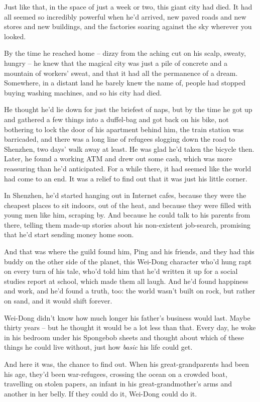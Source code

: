 Just like that, in the space of just a week or two, this giant city
had died. It had all seemed so incredibly powerful when he'd
arrived, new paved roads and new stores and new buildings, and the
factories soaring against the sky wherever you looked.

By the time he reached home -- dizzy from the aching cut on his
scalp, sweaty, hungry -- he knew that the magical city was just a
pile of concrete and a mountain of workers' sweat, and that it had
all the permanence of a dream. Somewhere, in a distant land he
barely knew the name of, people had stopped buying washing
machines, and so his city had died.

He thought he'd lie down for just the briefest of naps, but by the
time he got up and gathered a few things into a duffel-bag and got
back on his bike, not bothering to lock the door of his apartment
behind him, the train station was barricaded, and there was a long
line of refugees slogging down the road to Shenzhen, two days' walk
away at least. He was glad he'd taken the bicycle then. Later, he
found a working ATM and drew out some cash, which was more
reassuring than he'd anticipated. For a while there, it had seemed
like the world had come to an end. It was a relief to find out that
it was just his little corner.

In Shenzhen, he'd started hanging out in Internet cafes, because
they were the cheapest places to sit indoors, out of the heat, and
because they were filled with young men like him, scraping by. And
because he could talk to his parents from there, telling them
made-up stories about his non-existent job-search, promising that
he'd start sending money home soon.

And that was where the guild found him, Ping and his friends, and
they had this buddy on the other side of the planet, this Wei-Dong
character who'd hung rapt on every turn of his tale, who'd told him
that he'd written it up for a social studies report at school,
which made them all laugh. And he'd found happiness and work, and
he'd found a truth, too: the world wasn't built on rock, but rather
on sand, and it would shift forever.

Wei-Dong didn't know how much longer his father's business would
last. Maybe thirty years -- but he thought it would be a lot less
than that. Every day, he woke in his bedroom under his Spongebob
sheets and thought about which of these things he could live
without, just how \emph{basic} his life could get.

And here it was, the chance to find out. When his
great-grandparents had been his age, they'd been war-refugees,
crossing the ocean on a crowded boat, travelling on stolen papers,
an infant in his great-grandmother's arms and another in her belly.
If they could do it, Wei-Dong could do it.

